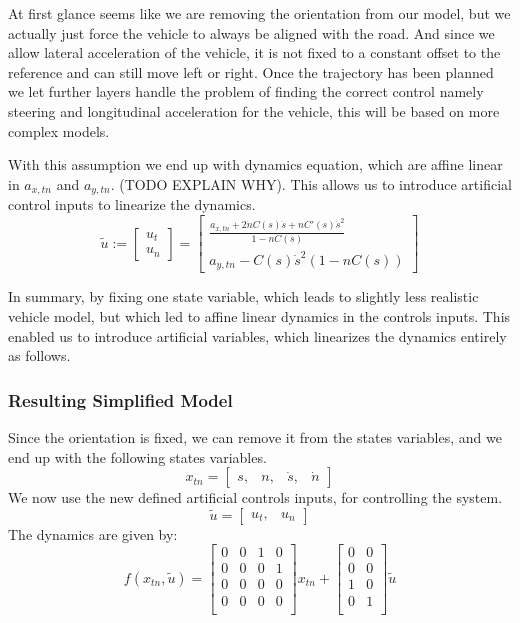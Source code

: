 At first glance seems like we are removing the orientation from our model, but we actually just force the vehicle to always be aligned with the road.
And since we allow lateral acceleration of the vehicle, it is not fixed to a constant offset to the reference and can still move left or right.
Once the trajectory has been planned we let further layers handle the problem of finding the correct control namely steering and longitudinal
acceleration for the vehicle, this will be based on more complex models.

With this assumption we end up with dynamics equation, which are affine linear in $a_{x,tn}$ and $a_{y,tn}$.
(TODO EXPLAIN WHY).
This allows us to introduce artificial control inputs to linearize the dynamics.
\begin{equation}
	\label{def:artificial_controls}
	\tilde{u} := \begin{bmatrix}
		u_t \\
		u_n
	\end{bmatrix} = \begin{bmatrix}
		\frac{
			a_{x,tn} + 2\dot{n}
		C(s)\dot{s} + nC'(s)\dot{s}^2 }{ 1 - nC(s) } \\ a_{y,tn} - C(s)\dot{s}^2(1 - nC(s))\end{bmatrix} \end{equation}

In summary, by
fixing one state variable, which leads to slightly less realistic vehicle model, but which led to affine linear dynamics in the controls inputs.
This enabled us to introduce artificial variables, which linearizes the dynamics entirely as follows.

\subsubsection{Resulting Simplified Model}

Since the orientation is fixed, we can remove it from the states variables, and we end up with the following states variables.
\[
	x_{tn} = \begin{bmatrix} s, & n, & \dot{s}, & \dot{n} \end{bmatrix}
\]
We now use the new defined artificial controls inputs, for controlling the system.
\[
	\tilde{u} = \begin{bmatrix} u_t, & u_n \end{bmatrix}
\]
The dynamics are given by:
\begin{equation}
	f(x_{tn}, \tilde{u}) = \begin{bmatrix}
		0 & 0 & 1 & 0 \\
		0 & 0 & 0 & 1 \\
		0 & 0 & 0 & 0 \\
		0 & 0 & 0 & 0 \\
	\end{bmatrix} x_{tn} + \begin{bmatrix}
		0 & 0 \\
		0 & 0 \\
		1 & 0 \\
		0 & 1 \\
	\end{bmatrix} \tilde{u}
\end{equation}

